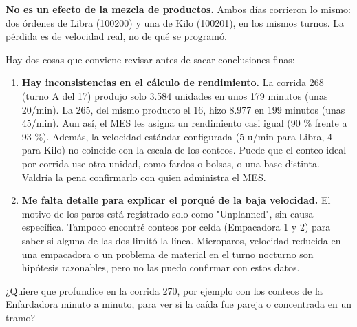 \begin{singlespace}
{\textbf{No es un efecto de la mezcla de productos.} Ambos días corrieron lo mismo: dos órdenes de Libra (100200) y una de Kilo (100201), en los mismos turnos. La pérdida es de velocidad real, no de qué se programó.



Hay dos cosas que conviene revisar antes de sacar conclusiones finas:



\begin{enumerate}[leftmargin=1.5em,itemsep=0pt,topsep=2pt]
\item \textbf{Hay inconsistencias en el cálculo de rendimiento.} La corrida 268 (turno A del 17) produjo solo 3.584 unidades en unos 179 minutos (unas 20/min). La 265, del mismo producto el 16, hizo 8.977 en 199 minutos (unas 45/min). Aun así, el MES les asigna un rendimiento casi igual (90 \% frente a 93 \%). Además, la velocidad estándar configurada (5 u/min para Libra, 4 para Kilo) no coincide con la escala de los conteos. Puede que el conteo ideal por corrida use otra unidad, como fardos o bolsas, o una base distinta. Valdría la pena confirmarlo con quien administra el MES.
\item \textbf{Me falta detalle para explicar el porqué de la baja velocidad.} El motivo de los paros está registrado solo como "Unplanned", sin causa específica. Tampoco encontré conteos por celda (Empacadora 1 y 2) para saber si alguna de las dos limitó la línea. Microparos, velocidad reducida en una empacadora o un problema de material en el turno nocturno son hipótesis razonables, pero no las puedo confirmar con estos datos.
\end{enumerate}



¿Quiere que profundice en la corrida 270, por ejemplo con los conteos de la Enfardadora minuto a minuto, para ver si la caída fue pareja o concentrada en un tramo?}

\end{singlespace}
